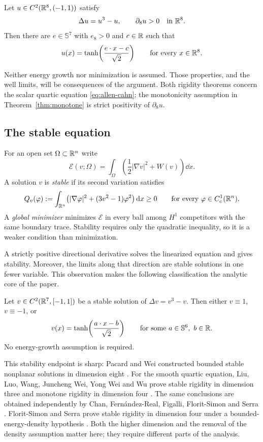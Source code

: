 \begin{theorem}
\label{thm:monotone}
Let $u\in C^2(\mathbb R^8,(-1,1))$ satisfy
\[
 \Delta u=u^3-u,\qquad \partial_8u>0\quad\text{in }\mathbb R^8.
\]
Then there are $e\in\mathbb S^7$ with $e_8>0$ and $c\in\mathbb R$ such that
\[
 u(x)=\tanh\!\left(\frac{e\cdot x-c}{\sqrt2}\right)
 \qquad\text{for every }x\in\mathbb R^8.
\]
\end{theorem}

Neither energy growth nor minimization is assumed.  Those properties,
and the well limits, will be consequences of the argument.
Both rigidity theorems concern the scalar quartic equation
\eqref{eq:allen-cahn}; the monotonicity assumption in
Theorem~\ref{thm:monotone} is strict positivity of $\partial_8u$.

\subsection{The stable equation}

For an open set $\Omega\subset\mathbb R^n$ write
\[
 \mathcal E(v;\Omega)
   =\int_\Omega\left(\frac12|\nabla v|^2+W(v)\right)\dd x.
\]
A solution $v$ is \emph{stable} if its second variation satisfies
\begin{equation}\label{eq:stability-definition}
 Q_v(\varphi):=
 \int_{\mathbb R^n}\bigl(|\nabla\varphi|^2+(3v^2-1)\varphi^2\bigr)\,\mathrm d x
 \ge0
 \qquad\text{for every }\varphi\in C_c^1(\mathbb R^n).
\end{equation}
A \emph{global minimizer} minimizes $\mathcal E$ in every ball
among $H^1$ competitors with the same boundary trace.
Stability requires only the quadratic inequality, so it is a weaker
condition than minimization.

A strictly positive directional derivative solves the linearized
equation and gives stability.  Moreover, the limits along that
direction are stable solutions in one fewer variable.
This observation makes the following classification the analytic
core of the paper.

\begin{theorem}
\label{thm:stable}
Let $v\in C^2(\mathbb R^7,[-1,1])$ be a stable solution of
$\Delta v=v^3-v$.  Then either $v\equiv1$, $v\equiv-1$, or
\[
 v(x)=\tanh\!\left(\frac{a\cdot x-b}{\sqrt2}\right)
 \qquad\text{for some }a\in\mathbb S^6,\ b\in\mathbb R.
\]
No energy-growth assumption is required.
\end{theorem}

This stability endpoint is sharp: Pacard and Wei constructed bounded
stable nonplanar solutions in dimension eight
\cite{PacardWei2013}.
For the smooth quartic equation, Liu, Luo, Wang, Juncheng Wei,
Yong Wei and Wu prove stable rigidity in dimension three and
monotone rigidity in dimension four \mbox{\cite{LLWWW2026}.}
The same conclusions are obtained independently by Chan, Fern\'andez-Real,
Figalli, Florit-Simon and Serra
\cite[Theorem~1.1 and Corollary~1.2]{CFFFS2026}.
Florit-Simon and Serra prove stable rigidity in dimension four
under a bounded-energy-density hypothesis \cite{FSS2025}.
Both the higher dimension and the removal of the density assumption
matter here; they require different parts of the analysis.

